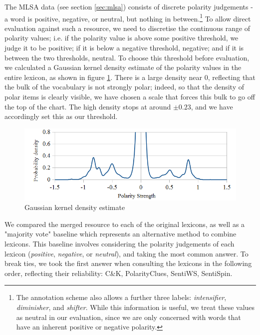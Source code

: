 \documentclass[11pt]{article}
\begin{document}
The MLSA data (see section \ref{sec:mlsa}) consists of discrete polarity judgements - a word is positive, negative, or neutral, but nothing in between.\footnote{The annotation scheme also allows a further three labels: \emph{intensifier}, \emph{diminisher}, and \emph{shifter}. While this information is useful, we treat these values as neutral in our evaluation, since we are only concerned with words that have an inherent positive or negative polarity.} To allow direct evaluation against such a resource, we need to discretise the continuous range of polarity values; i.e. if the polarity value is above some positive threshold, we judge it to be positive; if it is below a negative threshold, negative; and if it is between the two thresholds, neutral.  To choose this threshold before evaluation, we calculated a Gaussian kernel density estimate of the polarity values in the entire lexicon, as shown in figure \ref{fig:density}.  There is a large density near 0, reflecting that the bulk of the vocabulary is not strongly polar; indeed, so that the density of polar items is clearly visible, we have chosen a scale that forces this bulk to go off the top of the chart.  The high density stops at around $\pm 0.23$, and we have accordingly set this as our threshold.

\begin{figure}[t]
\begin{centering}
\includegraphics[scale=1]{density-wide.png}
\caption{Gaussian kernel density estimate}\label{fig:density}
\end{centering}
\end{figure}

We compared the merged resource to each of the original lexicons, as well as a "majority vote" baseline which represents an alternative method to combine lexicons.  This baseline involves considering the polarity judgements of each lexicon (\emph{positive}, \emph{negative}, or \emph{neutral}), and taking the most common answer.  To break ties, we took the first answer when consulting the lexicons in the following order, reflecting their reliability: C\&K, PolarityClues, SentiWS, SentiSpin.
\end{document}
